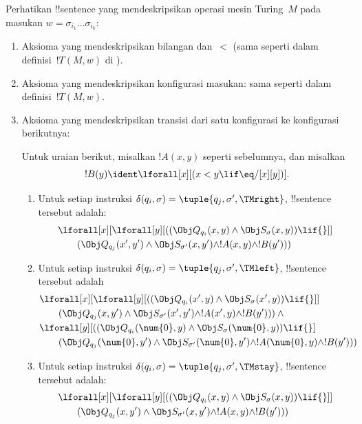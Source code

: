 \documentclass[../../../include/open-logic-section]{subfiles}
\begin{document}
Perhatikan !!{sentence} yang mendeskripsikan operasi mesin Turing~$M$ pada
masukan $w = \sigma_{i_1}\dots\sigma_{i_k}$:
\begin{enumerate}
\item Aksioma yang mendeskripsikan bilangan dan~$<$ (sama seperti dalam
definisi~$!T(M,w)$ di ).
\item Aksioma yang mendeskripsikan konfigurasi masukan: sama seperti dalam
definisi~$!T(M,w)$.
\item Aksioma yang mendeskripsikan transisi dari satu konfigurasi ke
  konfigurasi berikutnya:

Untuk uraian berikut, misalkan $!A(x, y)$ seperti sebelumnya, dan misalkan
\[
  !B(y) \ident \lforall[x][(x < y \lif \eq/[x][y])].
\]
\begin{enumerate}
\item {} Untuk setiap instruksi $\delta(q_i, \sigma) =
  \tuple{q_j, \sigma', \TMright}$, !!{sentence} tersebut adalah:
\begin{align*}
& \lforall[x][\lforall[y][(
   (\Obj Q_{q_i}(x, y) \land \Obj S_{\sigma}(x, y)) \lif {}]] \\
&\qquad   (\Obj Q_{q_j}(x', y') \land \Obj S_{\sigma'}(x, y') \land
!A(x, y) \land !B(y')))
\end{align*}
\item {} Untuk setiap instruksi $\delta(q_i, \sigma) =
  \tuple{q_j, \sigma', \TMleft}$, !!{sentence} tersebut adalah
\begin{align*}
& \lforall[x][\lforall[y][
    ((\Obj Q_{q_i}(x', y) \land \Obj S_{\sigma}(x', y)) \lif {}]]\\
& \qquad   (\Obj Q_{q_j}(x, y') \land \Obj S_{\sigma'}(x', y') \land
!A(x', y) \land !B(y'))) \land {}\\
& \lforall[y][((\Obj Q_{q_i}(\num{0}, y) \land \Obj S_{\sigma}(\num{0},
    y)) \lif {}]\\
& \qquad (\Obj Q_{q_j}(\num{0}, y') \land \Obj S_{\sigma'}(\num{0},
  y') \land !A(\num{0}, y) \land !B(y')))
\end{align*}
\item {} Untuk setiap instruksi $\delta(q_i, \sigma) =
  \tuple{q_j, \sigma', \TMstay}$, !!{sentence} tersebut adalah:
\begin{align*}
& \lforall[x][\lforall[y][(
   (\Obj Q_{q_i}(x, y) \land \Obj S_{\sigma}(x, y)) \lif {}]] \\
&\qquad (\Obj Q_{q_j}(x, y') \land \Obj S_{\sigma'}(x, y') \land
!A(x, y) \land !B(y')))
\end{align*}

\end{enumerate}
\end{enumerate}
\end{document}

